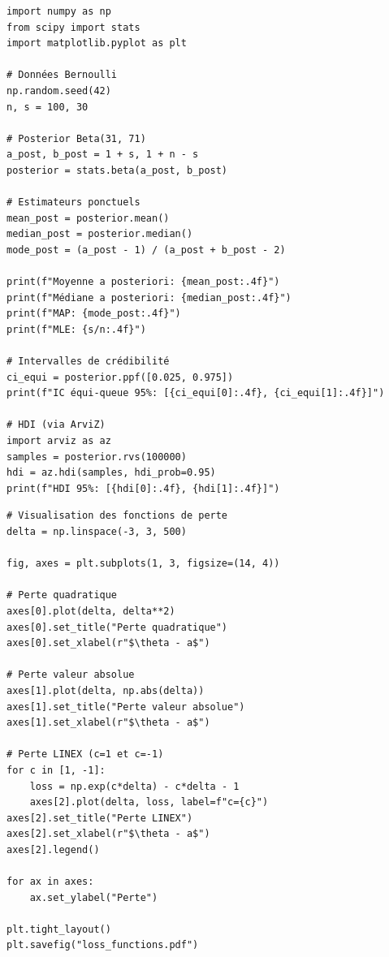 \begin{codeblock}[title=\textbf{Estimation bay\'esienne et intervalles de cr\'edibilit\'e}]
\begin{verbatim}
import numpy as np
from scipy import stats
import matplotlib.pyplot as plt

# Données Bernoulli
np.random.seed(42)
n, s = 100, 30

# Posterior Beta(31, 71)
a_post, b_post = 1 + s, 1 + n - s
posterior = stats.beta(a_post, b_post)

# Estimateurs ponctuels
mean_post = posterior.mean()
median_post = posterior.median()
mode_post = (a_post - 1) / (a_post + b_post - 2)

print(f"Moyenne a posteriori: {mean_post:.4f}")
print(f"Médiane a posteriori: {median_post:.4f}")
print(f"MAP: {mode_post:.4f}")
print(f"MLE: {s/n:.4f}")

# Intervalles de crédibilité
ci_equi = posterior.ppf([0.025, 0.975])
print(f"IC équi-queue 95%: [{ci_equi[0]:.4f}, {ci_equi[1]:.4f}]")

# HDI (via ArviZ)
import arviz as az
samples = posterior.rvs(100000)
hdi = az.hdi(samples, hdi_prob=0.95)
print(f"HDI 95%: [{hdi[0]:.4f}, {hdi[1]:.4f}]")
\end{verbatim}
\end{codeblock}

\begin{codeblock}[title=\textbf{Comparaison des fonctions de perte}]
\begin{verbatim}
# Visualisation des fonctions de perte
delta = np.linspace(-3, 3, 500)

fig, axes = plt.subplots(1, 3, figsize=(14, 4))

# Perte quadratique
axes[0].plot(delta, delta**2)
axes[0].set_title("Perte quadratique")
axes[0].set_xlabel(r"$\theta - a$")

# Perte valeur absolue
axes[1].plot(delta, np.abs(delta))
axes[1].set_title("Perte valeur absolue")
axes[1].set_xlabel(r"$\theta - a$")

# Perte LINEX (c=1 et c=-1)
for c in [1, -1]:
    loss = np.exp(c*delta) - c*delta - 1
    axes[2].plot(delta, loss, label=f"c={c}")
axes[2].set_title("Perte LINEX")
axes[2].set_xlabel(r"$\theta - a$")
axes[2].legend()

for ax in axes:
    ax.set_ylabel("Perte")

plt.tight_layout()
plt.savefig("loss_functions.pdf")
\end{verbatim}
\end{codeblock}

